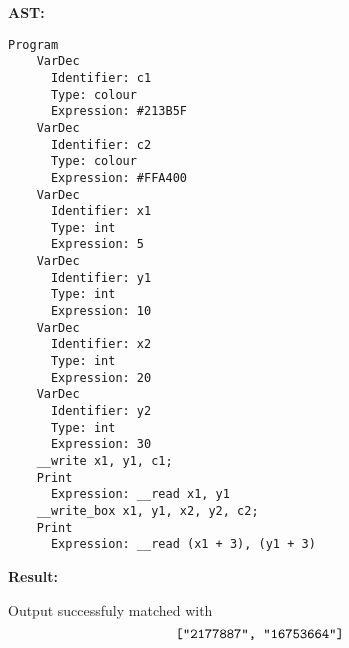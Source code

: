 \textbf{AST:}

{
  \lstset{xleftmargin=0.2\textwidth}

  \begin{lstlisting}
Program
    VarDec
      Identifier: c1
      Type: colour
      Expression: #213B5F
    VarDec
      Identifier: c2
      Type: colour
      Expression: #FFA400
    VarDec
      Identifier: x1
      Type: int
      Expression: 5
    VarDec
      Identifier: y1
      Type: int
      Expression: 10
    VarDec
      Identifier: x2
      Type: int
      Expression: 20
    VarDec
      Identifier: y2
      Type: int
      Expression: 30
    __write x1, y1, c1;
    Print
      Expression: __read x1, y1
    __write_box x1, y1, x2, y2, c2;
    Print
      Expression: __read (x1 + 3), (y1 + 3)
\end{lstlisting}

}

\textbf{Result:}

Output successfuly matched with $$\texttt{["2177887", "16753664"]}$$

\newpage
